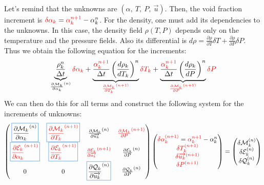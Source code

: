 Let's remind that the unknowns are $(\alpha,\ T,\ P,\ \vec{u})$. Then, the void fraction increment is ${\color{red}\delta \alpha_k}={\color{red}\alpha_k^{n+1}}-\alpha_k^{n}$. 
For the density, one must add its dependencies to the unknowns. In this case, the density field $\rho(T,P)$ depends only on the temperature and the pressure fields. Also its differential is $d\rho= \frac{\partial \rho}{\partial T}\delta T + \frac{\partial \rho}{\partial P}\delta P$. Thus we obtain the following equation for the increments:
\begin{equation}
    \underbrace{\frac{{ \rho_k^{n}}}{\Delta t}}_{ \frac{\partial \mathcal{M}_k}{\partial \alpha_k}^{(n)}}{\color{red} \delta \alpha_k}+\underbrace{\frac{\color{red}\alpha_k^{n+1}}{\Delta t} \left( \frac{d\rho_k}{dT_k} \right)^n}_{\color{red} \frac{\partial \mathcal{M}_k}{\partial T_k}^{(n+1)}} {\color{red} \delta T_k}+\underbrace{\frac{\color{red}\alpha_k^{n+1}}{\Delta t} \left( \frac{d\rho_k}{dP} \right)^n }_{\color{red} \frac{\partial \mathcal{M}_k}{\partial P}^{(n+1)}}{\color{red} \delta P}
\end{equation}
We can then do this for all terms and construct the following system for the increments of unknowns:
\begin{equation}
\begin{pmatrix}
\colorboxed{OPblue!50}{\frac{\partial \mathcal{M}_k}{\partial \alpha_k}^{(n)}} & \colorboxed{OPblue!50}{\color{red} \frac{\partial \mathcal{M}_k}{\partial T_k}^{(n+1)}} & \frac{\partial \mathcal{M}_k}{\partial \overrightarrow{u_k}}^{(n)} & {\color{red} \frac{\partial \mathcal{M}_k}{\partial P}^{(n+1)}} \\
\colorboxed{OPblue!50}{\color{red}\frac{\partial \mathcal{E}_k}{\partial \alpha_k}^{(n+1)}} & \colorboxed{OPblue!50}{\color{red}\frac{\partial \mathcal{E}_k}{\partial T_k}^{(n+1)}} & {\color{red}\frac{\partial \mathcal{E}_k}{\partial \overrightarrow{u_k}}^{(n+1)}} & \frac{\partial \mathcal{E}_k}{\partial P}^{(n)}\\
0 & 0 & \colorboxed{OPblue!50}{\frac{\partial \mathcal{Q}_k}{\partial \overrightarrow{u_k}}^{(n)}} & \frac{\partial \mathcal{Q}_k}{\partial P}^{(n)}
\end{pmatrix}\begin{pmatrix}
{\color{red} \delta\alpha_k ^{(n+1)}}={\color{red} \alpha_k^{n+1}}-\alpha_k^{n}\\
{\color{red} \delta T_k^{(n+1)}}\\
{\color{red}\delta \overrightarrow{u_k}^{(n+1)}}\\
{\color{red} \delta P^{(n+1)}}
\end{pmatrix}=\begin{pmatrix}
\delta\mathcal{M}_k^{(n)} \\
\delta\mathcal{E}_k^{(n)}\\
\delta\mathcal{Q}_k^{(n)}
\end{pmatrix}
\end{equation}
